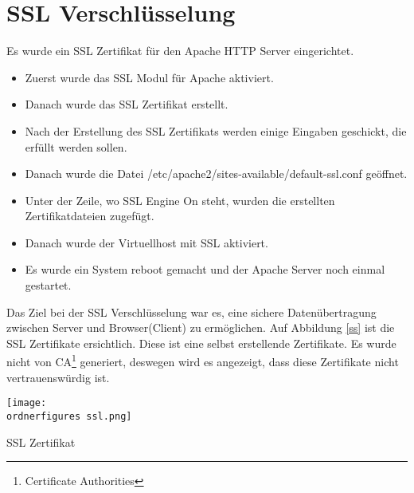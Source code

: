 \section{SSL Verschlüsselung}
Es wurde ein SSL Zertifikat für den Apache HTTP Server eingerichtet.
\begin{itemize}
	\item Zuerst wurde das SSL Modul für Apache aktiviert.
\end{itemize}
\begin{itemize}
	\item Danach wurde das SSL Zertifikat erstellt. 
\end{itemize}
\begin{itemize}
	\item Nach der Erstellung des SSL Zertifikats werden einige Eingaben geschickt, die erfüllt werden sollen. 
\end{itemize}
\begin{itemize}
	\item Danach wurde die Datei /etc/apache2/sites-available/default-ssl.conf geöffnet.
\end{itemize}
\begin{itemize}
	\item Unter der Zeile, wo SSL Engine On steht, wurden die erstellten Zertifikatdateien zugefügt.
\end{itemize}
\begin{itemize}
	\item Danach wurde der Virtuellhost mit SSL aktiviert. 
\end{itemize}
\begin{itemize}
	\item Es wurde ein System reboot gemacht und der Apache Server noch einmal gestartet. \cite{50_SSS}
\end{itemize}
Das Ziel bei der SSL Verschl\"usselung war es, eine sichere Daten\"ubertragung zwischen Server und Browser(Client) zu erm\"oglichen. 
Auf Abbildung \ref{ss} ist die SSL Zertifikate ersichtlich. Diese ist eine selbst erstellende Zertifikate. Es wurde nicht von CA\footnote{Certificate Authorities} generiert, deswegen wird es angezeigt, dass diese Zertifikate nicht vertrauenswürdig ist.
\begin{center}
	\captionsetup{type=figure}
	\texttt{[image: \\ordnerfigures ssl.png]}
	\caption{SSL Zertifikat}
	\label{ss} 
\end{center}
